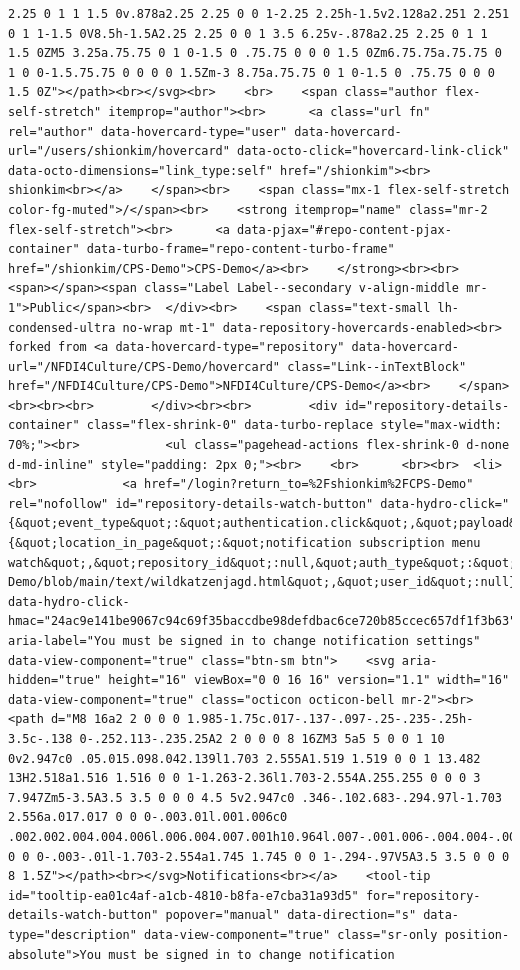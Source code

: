 \documentclass[
  letterpaper,
]{book}
\begin{document}
\begin{verbatim}
2.25 0 1 1 1.5 0v.878a2.25 2.25 0 0 1-2.25 2.25h-1.5v2.128a2.251 2.251 0 1 1-1.5 0V8.5h-1.5A2.25 2.25 0 0 1 3.5 6.25v-.878a2.25 2.25 0 1 1 1.5 0ZM5 3.25a.75.75 0 1 0-1.5 0 .75.75 0 0 0 1.5 0Zm6.75.75a.75.75 0 1 0 0-1.5.75.75 0 0 0 0 1.5Zm-3 8.75a.75.75 0 1 0-1.5 0 .75.75 0 0 0 1.5 0Z"></path><br></svg><br>    <br>    <span class="author flex-self-stretch" itemprop="author"><br>      <a class="url fn" rel="author" data-hovercard-type="user" data-hovercard-url="/users/shionkim/hovercard" data-octo-click="hovercard-link-click" data-octo-dimensions="link_type:self" href="/shionkim"><br>        shionkim<br></a>    </span><br>    <span class="mx-1 flex-self-stretch color-fg-muted">/</span><br>    <strong itemprop="name" class="mr-2 flex-self-stretch"><br>      <a data-pjax="#repo-content-pjax-container" data-turbo-frame="repo-content-turbo-frame" href="/shionkim/CPS-Demo">CPS-Demo</a><br>    </strong><br><br>    <span></span><span class="Label Label--secondary v-align-middle mr-1">Public</span><br>  </div><br>    <span class="text-small lh-condensed-ultra no-wrap mt-1" data-repository-hovercards-enabled><br>      forked from <a data-hovercard-type="repository" data-hovercard-url="/NFDI4Culture/CPS-Demo/hovercard" class="Link--inTextBlock" href="/NFDI4Culture/CPS-Demo">NFDI4Culture/CPS-Demo</a><br>    </span><br><br><br>        </div><br><br>        <div id="repository-details-container" class="flex-shrink-0" data-turbo-replace style="max-width: 70%;"><br>            <ul class="pagehead-actions flex-shrink-0 d-none d-md-inline" style="padding: 2px 0;"><br>    <br>      <br><br>  <li><br>            <a href="/login?return_to=%2Fshionkim%2FCPS-Demo" rel="nofollow" id="repository-details-watch-button" data-hydro-click="{&quot;event_type&quot;:&quot;authentication.click&quot;,&quot;payload&quot;:{&quot;location_in_page&quot;:&quot;notification subscription menu watch&quot;,&quot;repository_id&quot;:null,&quot;auth_type&quot;:&quot;LOG_IN&quot;,&quot;originating_url&quot;:&quot;https://github.com/shionkim/CPS-Demo/blob/main/text/wildkatzenjagd.html&quot;,&quot;user_id&quot;:null}}" data-hydro-click-hmac="24ac9e141be9067c94c69f35baccdbe98defdbac6ce720b85ccec657df1f3b63" aria-label="You must be signed in to change notification settings" data-view-component="true" class="btn-sm btn">    <svg aria-hidden="true" height="16" viewBox="0 0 16 16" version="1.1" width="16" data-view-component="true" class="octicon octicon-bell mr-2"><br>    <path d="M8 16a2 2 0 0 0 1.985-1.75c.017-.137-.097-.25-.235-.25h-3.5c-.138 0-.252.113-.235.25A2 2 0 0 0 8 16ZM3 5a5 5 0 0 1 10 0v2.947c0 .05.015.098.042.139l1.703 2.555A1.519 1.519 0 0 1 13.482 13H2.518a1.516 1.516 0 0 1-1.263-2.36l1.703-2.554A.255.255 0 0 0 3 7.947Zm5-3.5A3.5 3.5 0 0 0 4.5 5v2.947c0 .346-.102.683-.294.97l-1.703 2.556a.017.017 0 0 0-.003.01l.001.006c0 .002.002.004.004.006l.006.004.007.001h10.964l.007-.001.006-.004.004-.006.001-.007a.017.017 0 0 0-.003-.01l-1.703-2.554a1.745 1.745 0 0 1-.294-.97V5A3.5 3.5 0 0 0 8 1.5Z"></path><br></svg>Notifications<br></a>    <tool-tip id="tooltip-ea01c4af-a1cb-4810-b8fa-e7cba31a93d5" for="repository-details-watch-button" popover="manual" data-direction="s" data-type="description" data-view-component="true" class="sr-only position-absolute">You must be signed in to change notification 
\end{verbatim}
\end{document}
